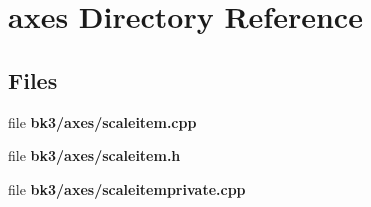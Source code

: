\section{axes Directory Reference}
\label{dir_1ffe2cfef6c402a7b6045319e0f9367d}
\subsection*{Files}
\begin{DoxyCompactItemize}
\item 
file {\bf bk3/axes/scaleitem.\+cpp}
\item 
file {\bf bk3/axes/scaleitem.\+h}
\item 
file {\bf bk3/axes/scaleitemprivate.\+cpp}
\end{DoxyCompactItemize}
